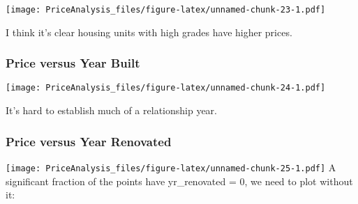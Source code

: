 \documentclass[]{article}
\newenvironment{Shaded}{\begin{snugshade}}{\end{snugshade}}
\newcommand{\KeywordTok}[1]{\textcolor[rgb]{0.13,0.29,0.53}{\textbf{#1}}}
\newcommand{\DataTypeTok}[1]{\textcolor[rgb]{0.13,0.29,0.53}{#1}}
\newcommand{\DecValTok}[1]{\textcolor[rgb]{0.00,0.00,0.81}{#1}}
\newcommand{\StringTok}[1]{\textcolor[rgb]{0.31,0.60,0.02}{#1}}
\newcommand{\OperatorTok}[1]{\textcolor[rgb]{0.81,0.36,0.00}{\textbf{#1}}}
\newcommand{\NormalTok}[1]{#1}
\begin{document}
\texttt{[image: PriceAnalysis\_files/figure-latex/unnamed-chunk-23-1.pdf]}

I think it's clear housing units with high grades have higher prices.

\subsubsection{Price versus Year Built}\label{price-versus-year-built}

\begin{Shaded}
\end{Shaded}

\texttt{[image: PriceAnalysis\_files/figure-latex/unnamed-chunk-24-1.pdf]}

It's hard to establish much of a relationship year.

\subsubsection{Price versus Year
Renovated}\label{price-versus-year-renovated}

\begin{Shaded}
\end{Shaded}

\texttt{[image: PriceAnalysis\_files/figure-latex/unnamed-chunk-25-1.pdf]}
A significant fraction of the points have yr\_renovated = 0, we need to
plot without it:

\begin{Shaded}
\end{Shaded}
\end{document}
